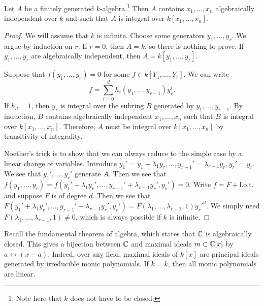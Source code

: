 \documentclass[twoside, 10pt]{article}
\begin{document}
    \begin{thm} Let $A$ be a finitely generated
        $k$-algebra.\footnote{Note here that $k$ does not have to be closed.}
        Then $A$ contains $x_1, \ldots, x_n$ algebraically independent over $k$
        and such that $A$ is integral over $k[x_1, \ldots, x_n]$.
        \begin{proof} We will assume that $k$ is infinite. Choose some
            generators $y_1, \ldots, y_r$. We argue by induction on $r$. If
            $r=0$, then $A=k$, so there is nothing to prove. If $y_1, \ldots,
            y_r$ are algebraically independent, then $A=k[y_1, \ldots, y_r]$. 
            
            Suppose that $f(y_1, \ldots, y_r) = 0$ for some $f \in k[Y_1,
            \ldots, Y_r]$. We can write \[ f = \sum_{i=0}^d h_i(y_1, \ldots,
            y_{r-1})y_r^i. \] If $h_d = 1$, then $y_r$ is integral over the
            subring $B$ generated by $y_1, \ldots, y_{r-1}$. By induction, $B$
            contains algebraically independent $x_1, \ldots, x_n$ such that $B$
            is integral over $k[x_1, \ldots, x_n]$. Therefore, $A$ must be
            integral over $k[x_1, \ldots, x_n]$ by transitivity of integrality.

            Noether's trick is to show that we can always reduce to the simple
            case by a linear change of variables. Introduce $y_1'=y_1-
            \lambda_1y_r, \ldots, y_{r-1}'=\lambda_{r-1}y_r, y_r' = y_r$. We
            see that $y_1', \ldots, y_r'$ generate $A$. Then we see that
            $f(y_1, \ldots, y_r) = f(y_1' + \lambda_1y_r', \ldots,
            y_{r-1}'+\lambda_{r-1}y_r', y_r') = 0$. Write $f = F +
            \mathrm{l.o.t.}$ and suppose $F$ is of degree $d$. Then we see that
            $F(y_1' + \lambda_1y_r', \ldots, y_{r-1}'+\lambda_{r-1}y_r', y_r')
            = F(\lambda_1, \ldots, \lambda_{r-1}, 1)y_r'^d$. We simply need
            $F(\lambda_1, \ldots, \lambda_{r-1}, 1) \neq 0$, which is always
        possible if $k$ is infinite.  \end{proof} \end{thm}

    Recall the fundamental theorem of algebra, which states that $\mathbb{C}$ is
    algebraically closed. This gives a bijection between $\mathbb{C}$ and maximal
    ideals $m \subset \mathbb{C}[x]$ by $a \leftrightarrow (x-a)$. Indeed, over any
    field, maximal ideals of $k[x]$ are principal ideals generated by
    irreducible monic polynomials. If $k = \overline{k}$, then all monic
    polynomials are linear.
\end{document}
